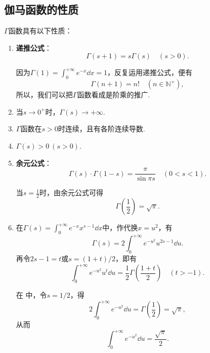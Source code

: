 \subsection{伽马函数的性质}
\begin{property}
\(\Gamma\)函数具有以下性质：
\begin{enumerate}
\item \textbf{递推公式}：\begin{equation}
\Gamma(s+1) = s \Gamma(s) \quad (s > 0).
\end{equation}

因为\(\Gamma(1) = \int_0^{+\infty} e^{-x} \dd{x} = 1\)，反复运用递推公式，便有\begin{equation}\label{equation:定积分.伽马函数与阶乘的联系}
\Gamma(n+1) = n! \quad (n\in\mathbb{N}^+),
\end{equation}所以，我们可以把\(\Gamma\)函数看成是阶乘的推广.

\item 当\(s\to0^+\)时，\(\Gamma(s) \to +\infty\).

\item \(\Gamma\)函数在\(s > 0\)时连续，且有各阶连续导数.

\item \(\Gamma(s) > 0\ (s>0)\).

\item \textbf{余元公式}：\begin{equation}\label{equation:定积分.余元公式}
\Gamma(s) \cdot \Gamma(1-s) = \frac{\pi}{\sin{\pi s}} \quad (0 < s < 1).
\end{equation}

当\(s = \frac{1}{2}\)时，由余元公式可得\begin{equation}
\Gamma\left(\frac{1}{2}\right) = \sqrt{\pi}.
\end{equation}

\item 在\(\Gamma(s) = \int_0^{+\infty} e^{-x} x^{s-1} \dd{x}\)中，作代换\(x = u^2\)，有\begin{equation}\label{equation:定积分.伽马函数.中间步骤1}
\Gamma(s) = 2 \int_0^{+\infty} e^{-u^2} u^{2s-1} \dd{u}.
\end{equation}
再令\(2s-1 = t\)或\(s = (1+t)/2\)，即有\begin{equation}
\int_0^{+\infty} e^{-u^2} u^t \dd{u}
= \frac{1}{2} \Gamma\left(\frac{1+t}{2}\right)
\quad (t > -1).
\end{equation}

在  中，令\(s=1/2\)，得\[
2\int_0^{+\infty} e^{-u^2} \dd{u}
= \Gamma\left(\frac{1}{2}\right)
= \sqrt{\pi},
\]从而\begin{equation}
\int_0^{+\infty} e^{-u^2} \dd{u} = \frac{\sqrt{\pi}}{2}.
\end{equation}
\end{enumerate}
\end{property}

